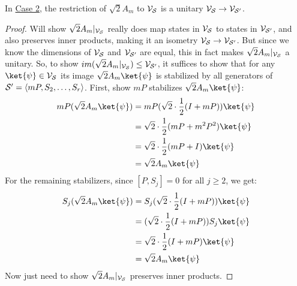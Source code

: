 \begin{proposition}\label{prop:A_m_unitary_up_to_normalisation}
    In \hyperref[thm:stabilizer_group_update_measurement:case2]{Case 2}, the restriction of $\sqrt{2} A_m$ to $\mathcal{V}_{\mathcal{S}}$ is a unitary $\mathcal{V}_{\mathcal{S}} \to \mathcal{V}_{\mathcal{S}'}$.
    \begin{proof}
        Will show $\sqrt{2} A_m|_{\mathcal{V}_{\mathcal{S}}}$ really does map states in $\mathcal{V}_{\mathcal{S}}$ to states in $\mathcal{V}_{\mathcal{S}'}$, and also preserves inner products, making it an isometry $\mathcal{V}_{\mathcal{S}} \to \mathcal{V}_{\mathcal{S}'}$.
        But since we know the dimensions of $\mathcal{V}_{\mathcal{S}}$ and $\mathcal{V}_{\mathcal{S}'}$ are equal, this in fact makes $\sqrt{2} A_m|_{\mathcal{V}_{\mathcal{S}}}$ a unitary.
        So, to show $im(\sqrt{2} A_m|_{\mathcal{V}_{\mathcal{S}}}) \leq \mathcal{V}_{\mathcal{S}'}$, it suffices to show that for any $\ket{\psi} \in \VVV_\SSS$ its image $\sqrt{2} A_m\ket{\psi}$ is stabilized by all generators of $\mathcal{S}' = \langle mP, S_2, \ldots, S_r \rangle$.
        First, show $mP$ stabilizes $\sqrt{2} A_m\ket{\psi}$:
        \begin{equation}\label{eq:mP_stabilizes_new_state}
        \begin{aligned}
            mP(\sqrt{2} A_m\ket{\psi})
            &= mP(\sqrt{2} \cdot \frac{1}{2}(I + mP))\ket{\psi} \\
            &= \sqrt{2} \cdot \frac{1}{2}(mP + m^2 P^2) \ket{\psi} \\
            &= \sqrt{2} \cdot \frac{1}{2}(mP + I) \ket{\psi} \\
            &= \sqrt{2} A_m\ket{\psi} \\
        \end{aligned}
        \end{equation}
        For the remaining stabilizers, since $[P, S_j] = 0$ for all $j \geq 2$, we get:
        \begin{equation}\label{eq:S_j_stabilizes_new_state}
        \begin{aligned}
            S_j(\sqrt{2} A_m\ket{\psi})
            &= S_j(\sqrt{2} \cdot \frac{1}{2}(I + mP))\ket{\psi} \\
            &= (\sqrt{2} \cdot \frac{1}{2}(I + mP)) S_j \ket{\psi} \\
            &= \sqrt{2} \cdot \frac{1}{2}(I + mP) \ket{\psi} \\
            &= \sqrt{2} A_m\ket{\psi} \\
        \end{aligned}
        \end{equation}
        Now just need to show $\sqrt{2} A_m|_{\mathcal{V}_{\mathcal{S}}}$ preserves inner products.

\end{proof}
\end{proposition}
